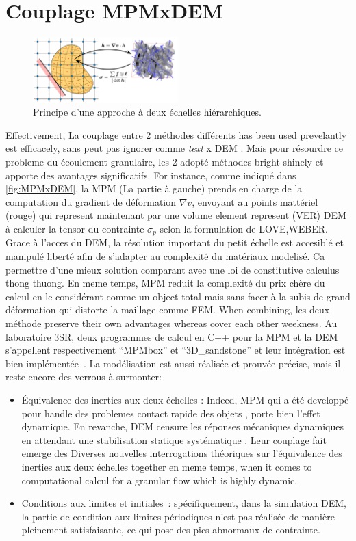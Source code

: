 \documentclass[a4paper,12pt]{report}
\begin{document}
\section{Couplage MPMxDEM}
\begin{figure}[h]
\centering
\includegraphics[width=0.5\textwidth]{CouplageMPMxDEM.png}
\caption{Principe d’une approche à deux échelles hiérarchiques.\cite{projetderecherche}}
\label{fig:MPMxDEM}
\end{figure}
Effectivement, La couplage entre 2 méthodes différents has been used prevelantly est efficacely, sans peut pas ignorer comme \emph{text} x DEM \cite{nguyen2013modelisation}. 
Mais pour résourdre ce probleme du écoulement granulaire, les 2 adopté méthodes bright shinely et apporte des avantages significatifs.
For instance, comme indiqué dans \autoref{fig:MPMxDEM}, la MPM (La partie à gauche) prends en charge de la computation du gradient de déformation $\nabla v$, envoyant au points mattériel (rouge) qui represent maintenant par une volume element represent (VER) DEM à calculer la tensor du contrainte $\sigma_p$ selon la formulation de LOVE,WEBER.
Grace à l'acces du DEM, la résolution important du petit échelle est accesiblé et manipulé liberté afin de s'adapter au complexité du matériaux modelisé. 
Ca permettre d'une mieux solution comparant avec une loi de constitutive calculus thong thuong.
En meme temps, MPM reduit la complexité du prix chère du calcul en le considérant comme un object total mais sans facer à la subis de grand déformation qui distorte la maillage comme FEM.
When combining, les deux méthode preserve their own advantages whereas cover each other weekness.
Au laboratoire 3SR, deux programmes de calcul en C++ pour la MPM et la DEM s'appellent respectivement ``MPMbox'' et ``3D\_sandstone'' et leur intégration est bien implémentée~\cite{richefeu2025mpmxdem}.
La modélisation est aussi réalisée et prouvée précise, mais il reste encore des verrous à surmonter:
\begin{itemize}
    \item Équivalence des inerties aux deux échelles : Indeed, MPM qui a été developpé pour handle des problemes contact rapide des objets \cite{nguyen2023material.}, porte bien l'effet dynamique. En revanche, DEM censure les réponses mécaniques dynamiques en attendant une stabilisation statique systématique \cite{nguyen2014fem}. Leur couplage fait emerge des Diverses nouvelles interrogations théoriques sur l'équivalence des inerties aux deux échelles together en meme temps, when it comes to computational calcul for a granular flow which is highly dynamic.
    \item Conditions aux limites et initiales~: spécifiquement, dans la simulation DEM, la partie de condition aux limites périodiques n'est pas réalisée de manière pleinement satisfaisante, ce qui pose des pics abnormaux de contrainte.
\end{itemize}
\end{document}
